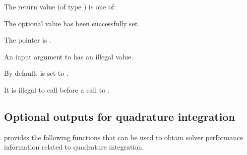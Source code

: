 {
  The return value  (of type ) is one of:
  \begin{args}
  \item[\Id{CV\_SUCCESS}] 
    The optional value has been successfully set.
  \item[\Id{CV\_MEM\_NULL}]
    The  pointer is .
  \item[\Id{CV\_ILL\_INPUT}] 
    An input argument to  has an illegal value.
  \end{args}
}
{
  By default,  is set to . 

  {\warn}It is illegal to call  before a call 
  to .
}


\subsection{Optional outputs for quadrature integration}\label{ss:quad_optional_output}

{\cvodes} provides the following functions that can be used to obtain solver
performance information related to quadrature integration.

